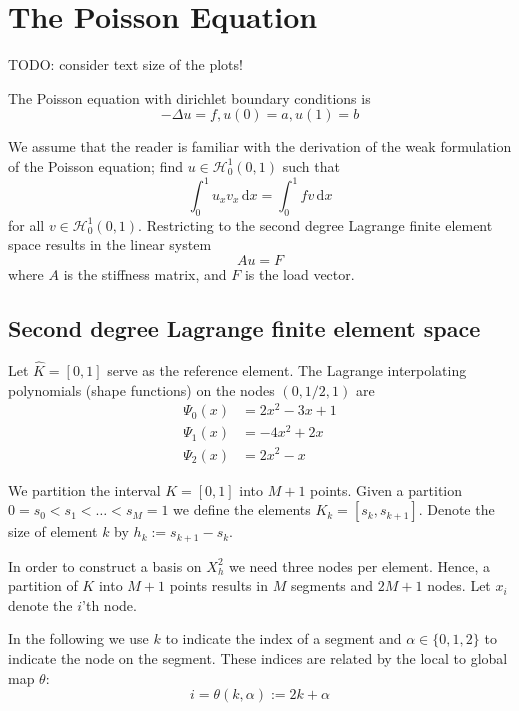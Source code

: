 \section{The Poisson Equation}

TODO: consider text size of the plots!

The Poisson equation with dirichlet boundary conditions is
\begin{equation}
    - \Delta u = f, u(0) = a, u(1) = b
\end{equation}

We assume that the reader is familiar with the
derivation of the weak formulation of the Poisson equation;
find \( u \in \mathcal{H}_0^1(0, 1) \) such that
\begin{equation}
  \label{eq:weak}
    \int_{0}^{1}u_x v_x \,\mathrm{d}x = \int_{0}^{1}f v \,\mathrm{d}x
\end{equation}
for all \( v \in \mathcal{H}^1_0 (0,1)\).
Restricting to the second degree Lagrange finite element space
results in the linear system
\begin{equation}
    Au = F
\end{equation}
where \( A \) is the stiffness matrix,
and \( F \) is the load vector.

\subsection{Second degree Lagrange finite element space}\label{sec:sec}

Let \( \hat{K} = [0, 1] \) serve as the reference element.
The Lagrange interpolating polynomials (shape functions)
on the nodes \( (0, 1/2, 1) \) are
\begin{align}
  \Psi_0(x) &= 2x^2 - 3x + 1\\
  \Psi_1(x) &= -4x^2 + 2x\\
  \Psi_2(x) &= 2x^2 - x
\end{align}

We partition the interval \( K = [0, 1] \) into \( M + 1 \) points.
Given a partition \( 0 = s_0 < s_1 < \dots < s_M = 1  \)
we define the elements \( K_k = [s_{k}, s_{k+1}] \).
Denote the size of element \( k \) by \( h_k := s_{k+1} - s_{k} \).

In order to construct a basis on \( X_h^2 \) we need three
nodes per element.
Hence, a partition of \( K \) into \( M + 1 \) points
results in \( M \) segments and \( 2M + 1 \) nodes.
Let \( x_i \) denote the \( i \)'th node.

In the following we use \( k \) to indicate the index
of a segment and \( \alpha \in \{  0, 1, 2  \} \) to indicate
the node on the segment. These indices are related by the
local to global map \( \theta \):
\begin{equation}
  \label{eq:loc2glob}
  i = \theta(k, \alpha) := 2k + \alpha    
\end{equation}

